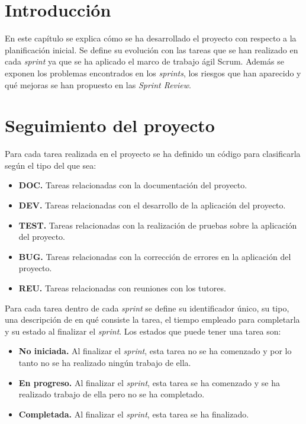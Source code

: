 \section{Introducción}

En este capítulo se explica cómo se ha desarrollado el proyecto con respecto a la planificación inicial. Se define su evolución con las tareas que se han realizado en cada \textit{sprint} ya que se ha aplicado el marco de trabajo ágil Scrum. Además se exponen los problemas encontrados en los \textit{sprints}, los riesgos que han aparecido y qué mejoras se han propuesto en las \textit{Sprint Review}. 

\section{Seguimiento del proyecto}
Para cada tarea realizada en el proyecto se ha definido un código para clasificarla según el tipo del que sea:
\begin{itemize}
    \item \textbf{DOC.} Tareas relacionadas con la documentación del proyecto.
     \item \textbf{DEV.} Tareas relacionadas con el desarrollo de la aplicación del proyecto.
     \item \textbf{TEST.} Tareas relacionadas con la realización de pruebas sobre la aplicación del proyecto.
     \item \textbf{BUG.} Tareas relacionadas con la corrección de errores en la aplicación del proyecto.
     \item \textbf{REU.} Tareas relacionadas con reuniones con los tutores.
\end{itemize}

Para cada tarea dentro de cada \textit{sprint} se define su identificador único, su tipo, una descripción de en qué consiste la tarea, el tiempo empleado para completarla y su estado al finalizar el \textit{sprint}. Los estados que puede tener una tarea son:
\begin{itemize}
    \item \textbf{No iniciada.} Al finalizar el \textit{sprint}, esta tarea no se ha comenzado y por lo tanto no se ha realizado ningún trabajo de ella.
    \item \textbf{En progreso.} Al finalizar el \textit{sprint}, esta tarea se ha comenzado y se ha realizado trabajo de ella pero no se ha completado.
    \item \textbf{Completada.} Al finalizar el \textit{sprint}, esta tarea se ha finalizado.
\end{itemize}



